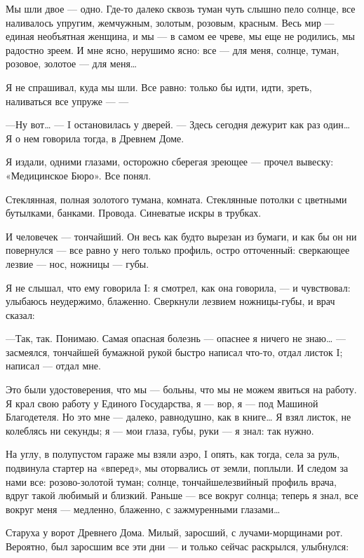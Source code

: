 \documentclass[11pt,openany]{book}
\begin{document}
Мы шли двое --- одно. Где-то далеко сквозь туман чуть слышно пело солнце, все наливалось упругим, жемчужным, золотым, розовым, красным. Весь мир --- единая необъятная женщина, и мы --- в самом ее чреве, мы еще не родились, мы радостно зреем. И мне ясно, нерушимо ясно: все --- для меня, солнце, туман, розовое, золотое --- для меня\ldots{}

Я не спрашивал, куда мы шли. Все равно: только бы идти, идти, зреть, наливаться все упруже --- ---

---Ну вот\ldots{} --- I остановилась у дверей. --- Здесь сегодня дежурит как раз один\ldots{} Я о нем говорила тогда, в Древнем Доме.

Я издали, одними глазами, осторожно сберегая зреющее --- прочел вывеску: «Медицинское Бюро». Все понял.

Стеклянная, полная золотого тумана, комната. Стеклянные потолки с цветными бутылками, банками. Провода. Синеватые искры в трубках.

И человечек --- тончайший. Он весь как будто вырезан из бумаги, и как бы он ни повернулся --- все равно у него только профиль, остро отточенный: сверкающее лезвие --- нос, ножницы --- губы.

Я не слышал, что ему говорила I: я смотрел, как она говорила, --- и чувствовал: улыбаюсь неудержимо, блаженно. Сверкнули лезвием ножницы-губы, и врач сказал:

---Так, так. Понимаю. Самая опасная болезнь --- опаснее я ничего не знаю\ldots{} --- засмеялся, тончайшей бумажной рукой быстро написал что-то, отдал листок I; написал --- отдал мне.

Это были удостоверения, что мы --- больны, что мы не можем явиться на работу. Я крал свою работу у Единого Государства, я --- вор, я --- под Машиной Благодетеля. Но это мне --- далеко, равнодушно, как в книге\ldots{} Я взял листок, не колеблясь ни секунды; я --- мои глаза, губы, руки --- я знал: так нужно.

На углу, в полупустом гараже мы взяли аэро, I опять, как тогда, села за руль, подвинула стартер на «вперед», мы оторвались от земли, поплыли. И следом за нами все: розово-золотой туман; солнце, тончайшелезвийный профиль врача, вдруг такой любимый и близкий. Раньше --- все вокруг солнца; теперь я знал, все вокруг меня --- медленно, блаженно, с зажмуренными глазами\ldots{}

Старуха у ворот Древнего Дома. Милый, заросший, с лучами-морщинами рот. Вероятно, был заросшим все эти дни --- и только сейчас раскрылся, улыбнулся:
\end{document}
